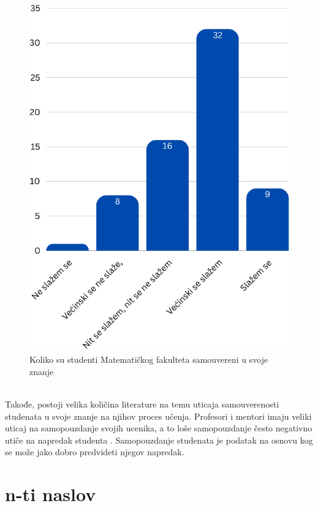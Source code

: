 \documentclass[a4paper]{article}
\begin{document}
{\begin{figure}[h!]
\begin{center}
    \includegraphics[scale = 0.3]{SamouverenostStudenataMatf.png}
    \caption{Koliko su studenti Matematičkog fakulteta samouvereni u svoje znanje}
    \label{fig:samouverenost_matf}
\end{center}
\end{figure}
\\
Takođe, postoji velika količina literature na temu uticaja samouverenosti studenata u svoje znanje na njihov proces učenja. Profesori i mentori imaju veliki uticaj na samopouzdanje svojih ucenika, a to loše samopouzdanje često negativno utiče na napredak studenta \cite{G1}. 
Samopouzdanje studenata je podatak na osnovu kog se može jako dobro predvideti njegov napredak.\cite{G2}



\section{n-ti naslov}

}
\end{document}
